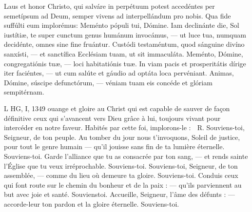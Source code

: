 \documentclass[RG2023_CarnetCommun.tex]{subfiles}
\begin{document}


Laus et honor Christo, qui salváre in perpétuum
potest accedéntes per semetípsum ad Deum, semper
vivens ad interpellándum pro nobis. Qua fide
suffúlti eum implorémus:
Meménto pópuli tui, Dómine.
Iam declinánte die, Sol iustítiæ, te super cunctum
genus humánum invocámus,
–– ut luce tua, numquam decidénte, omnes sine fine
fruántur.
Custódi testaméntum, quod sánguine divíno sanxísti,
–– et sanctífica Ecclésiam tuam, ut sit immaculáta.
Meménto, Dómine, congregatiónis tuæ,
–– loci habitatiónis tuæ.
In viam pacis et prosperitátis dírige iter faciéntes,
–– ut cum salúte et gáudio ad optáta loca pervéniant.
Animas, Dómine, súscipe defunctórum,
–– véniam tuam eis concéde et glóriam sempitérnam.

L HG, I,
1349
ouange et gloire au Christ qui
est capable de sauver de façon
définitive ceux qui s’avancent
vers Dieu grâce à lui, toujours
vivant pour intercéder en notre
faveur. Habités par cette foi,
implorons-le :
􀀽 R. Souviens-toi, Seigneur, de ton
peuple.
Au tomber du jour nous t’invoquons,
Soleil de justice, pour
tout le genre humain — qu’il
jouisse sans fin de ta lumière
éternelle. Souviens-toi.
Garde l’alliance que tu as consacrée
par ton sang, — et rends
sainte l’Église que tu veux irréprochable.
Souviens-toi.
Souviens-toi, Seigneur, de ton
assemblée, — comme du lieu où
demeure ta gloire. Souviens-toi.
Conduis ceux qui font route sur
le chemin du bonheur et de la
paix : — qu’ils parviennent au
but avec joie et santé. Souvienstoi.
Accueille, Seigneur, l’âme des
défunts : — accorde-leur ton
pardon et la gloire éternelle.
Souviens-toi.

\label{conclusionLV}





\end{document}
